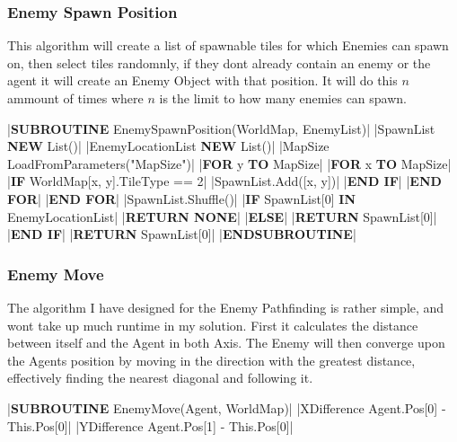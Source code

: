 \begin{flushleft}
                \vspace{0.5cm}
            \subsubsection{Enemy Spawn Position}
                This algorithm will create a list of spawnable tiles for which Enemies can spawn on, then select tiles randomnly, if they dont
                already contain an enemy or the agent it will create an Enemy Object with that position. It will do this $n$ ammount of times 
                where $n$ is the limit to how many enemies can spawn.
                
                \vspace{0.2cm}
                \begin{pseudocode}
|\textbf{SUBROUTINE} EnemySpawnPosition(WorldMap, EnemyList)|
    |SpawnList \leftarrow \textbf{NEW} List()|
    |EnemyLocationList \leftarrow \textbf{NEW} List()|
    |MapSize \leftarrow LoadFromParameters("MapSize")|
    |\textbf{FOR} y  \textbf{TO} MapSize|
        |\textbf{FOR} x  \textbf{TO} MapSize|
            |\textbf{IF} WorldMap[x, y].TileType == 2|
                |SpawnList.Add([x, y])|
            |\textbf{END IF}|
        |\textbf{END FOR}|
    |\textbf{END FOR}|
    |SpawnList.Shuffle()|
    |\textbf{IF} SpawnList[0] \textbf{IN} EnemyLocationList|
        |\textbf{RETURN NONE}|
    |\textbf{ELSE}|
        |\textbf{RETURN} SpawnList[0]|
    |\textbf{END IF}|
    |\textbf{RETURN} SpawnList[0]|
|\textbf{ENDSUBROUTINE}|
                \end{pseudocode}

                \vspace{0.5cm}
            \subsubsection{Enemy Move}
                The algorithm I have designed for the Enemy Pathfinding is rather simple, and wont take up much runtime in my solution.
                First it calculates the distance between itself and the Agent in both Axis. The Enemy will then converge upon the Agents
                position by moving in the direction with the greatest distance, effectively finding the nearest diagonal and following it.

                \vspace{0.2cm}
                \begin{pseudocode}
|\textbf{SUBROUTINE} EnemyMove(Agent, WorldMap)|
    |XDifference \leftarrow Agent.Pos[0] - This.Pos[0]|
    |YDifference \leftarrow Agent.Pos[1] - This.Pos[0]|


\end{pseudocode}
\end{flushleft}
